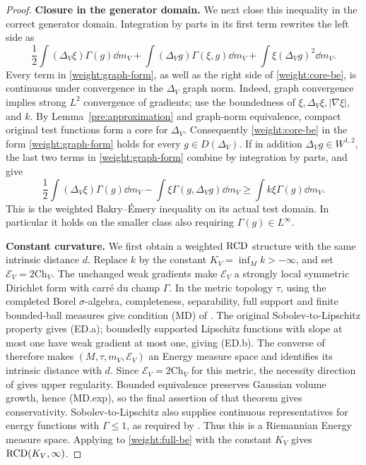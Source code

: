 \begin{proof}
\smallskip\noindent\textbf{Closure in the generator domain.}
We next close this inequality in the correct generator domain.
Integration by parts in its first term rewrites the left side as
\begin{equation}
\label{weight:graph-form}
\frac12\int (\Delta_V\xi)\Gamma(g)\dd m_V
 +\int (\Delta_Vg)\Gamma(\xi,g)\dd m_V
 +\int\xi(\Delta_Vg)^2\dd m_V.
\end{equation}
Every term in \eqref{weight:graph-form}, as well as the right
side of \eqref{weight:core-be}, is continuous under convergence
in the \(\Delta_V\) graph norm. Indeed, graph convergence implies
strong \(L^2\) convergence of gradients; use the boundedness of
\(\xi,\Delta_V\xi,|\nabla\xi|\), and \(k\).
By Lemma~\ref{pre:approximation} and graph-norm equivalence,
compact original test functions form a core for \(\Delta_V\).
Consequently \eqref{weight:core-be} in the form
\eqref{weight:graph-form} holds for every \(g\in D(\Delta_V)\).
If in addition \(\Delta_Vg\in W^{1,2}\), the last two terms
in \eqref{weight:graph-form} combine by integration by parts,
and give
\begin{equation}
\label{weight:full-be}
\frac12\int (\Delta_V\xi)\Gamma(g)\dd m_V
-\int\xi\Gamma(g,\Delta_Vg)\dd m_V
\ge\int k\xi\Gamma(g)\dd m_V.
\end{equation}
This is the weighted Bakry--\'Emery inequality on its actual
test domain. In particular it holds on the smaller class also
requiring \(\Gamma(g)\in L^\infty\).

\smallskip\noindent\textbf{Constant curvature.}
We first obtain a weighted \(\mathrm{RCD}\) structure with the same
intrinsic distance \(d\). Replace \(k\) by the constant
\(K_V=\inf_M k> -\infty\), and set
\(\mathcal E_V=2\mathrm{Ch}_V\). The unchanged weak gradients
make \(\mathcal E_V\) a strongly local symmetric Dirichlet form
with carr\'e du champ \(\Gamma\).
In the metric topology \(\tau\), using the completed Borel
\(\sigma\)-algebra, completeness, separability, full support
and finite bounded-ball measures give condition \textup{(MD)}
of \cite{AGS2015}.
The original Sobolev-to-Lipschitz property gives \textup{(ED.a)};
boundedly supported Lipschitz functions with slope at most one
have weak gradient at most one, giving \textup{(ED.b)}.
The converse of \cite[Theorem~3.9]{AGS2015} therefore makes
\((M,\tau,m_V,\mathcal E_V)\) an Energy measure space and
identifies its intrinsic distance with \(d\).
Since \(\mathcal E_V=2\mathrm{Ch}_V\) for this metric,
the necessity direction of \cite[Theorem~3.14]{AGS2015}
gives upper regularity. Bounded equivalence preserves Gaussian
volume growth, hence \textup{(MD.exp)}, so the final assertion
of that theorem gives conservativity.
Sobolev-to-Lipschitz also supplies continuous representatives
for energy functions with \(\Gamma\le1\), as required by
\cite[Definition~3.16]{AGS2015}. Thus this is a Riemannian
Energy measure space. Applying \cite[Theorem~4.17]{AGS2015}
to \eqref{weight:full-be} with the constant \(K_V\) gives
\(\mathrm{RCD}(K_V,\infty)\).


\end{proof}
